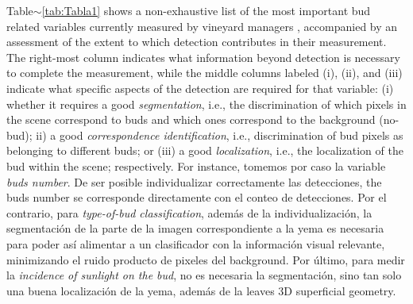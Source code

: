 \documentclass[a4paper,authoryear,review]{elsarticle}
\begin{document}
%
Table$\sim$\ref{tab:Tabla1} shows a non-exhaustive list of the most important bud related variables currently measured by vineyard managers \citep{sanchez2005bud, noyce2016basis, collins2020effects}, accompanied by an assessment of the extent to which detection contributes in their measurement. The right-most column indicates what information beyond detection  is necessary to complete the measurement, while the middle columns labeled (i), (ii), and (iii) indicate what specific aspects of the detection are required for that variable: (i) whether it requires a good  \emph{segmentation}, i.e., the discrimination of which pixels in the scene correspond to buds and which ones correspond to the background (no-bud); ii) a good \emph{correspondence identification}, i.e., discrimination of bud pixels as belonging to different buds; or (iii) a good \emph{localization}, i.e., the localization of the bud within the scene; respectively.
%
For instance, tomemos por caso la variable \emph{buds number}. De ser posible individualizar correctamente las detecciones, the buds number se corresponde directamente con el conteo de detecciones. Por el contrario, para \emph{type-of-bud classification}, además de la individualización, la segmentación de la parte de la imagen correspondiente a la yema es necesaria para poder así alimentar a un clasificador con la información visual relevante, minimizando el ruido producto de pixeles del background. Por último, para medir la \emph{incidence of sunlight on the bud}, no es necesaria la segmentación, sino tan solo una buena localización de la yema, además de la leaves 3D superficial geometry.
\end{document}
